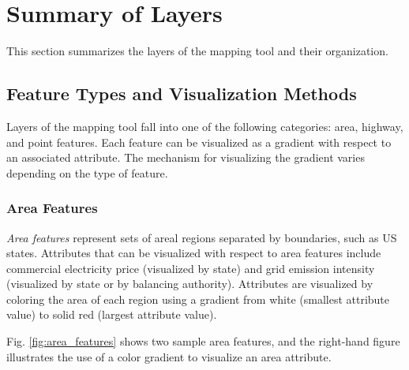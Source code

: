 \section{Summary of Layers}
\label{sec:layers}
This section summarizes the layers of the mapping tool and their organization. 

\subsection{Feature Types and Visualization Methods}

Layers of the mapping tool fall into one of the following categories: area, highway, and point features. Each feature can be visualized as a gradient with respect to an associated attribute. The mechanism for visualizing the gradient varies depending on the type of feature.

\subsubsection{Area Features}
\textit{Area features} represent sets of areal regions separated by boundaries, such as US states. Attributes that can be visualized with respect to area features include commercial electricity price (visualized by state) and grid emission intensity (visualized by state or by balancing authority). Attributes are visualized by coloring the area of each region using a gradient from white (smallest attribute value) to solid red (largest attribute value). 

Fig. \ref{fig:area_features} shows two sample area features, and the right-hand figure illustrates the use of a color gradient to visualize an area attribute. 

